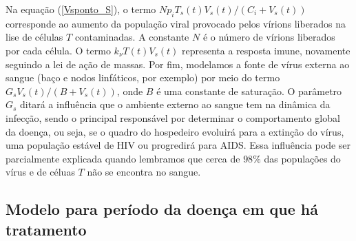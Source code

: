 Na equação (\ref{Vsponto_S}), o termo \( N p_{ i } T_{ s } ( t ) V_{ s } ( t ) / ( C_{ i } + V_{ s } ( t ) ) \) corresponde ao aumento da população viral provocado pelos vírions liberados na lise de células \( T \) contaminadas.
A constante \( N \) é o número de vírions liberados por cada célula.
O termo \( k_{ \nu } T ( t ) V_{ s } ( t ) \) representa a resposta imune, novamente seguindo a lei de ação de massas.
Por fim, modelamos a fonte de vírus externa ao sangue (baço e nodos linfáticos, por exemplo) por meio do termo \( G_{ s } V_{ s } ( t ) / ( B + V_{ s } ( t ) ) \), onde \( B \) é uma constante de saturação.
O parâmetro \( G_{ s } \) ditará a influência que o ambiente externo ao sangue tem na dinâmica da infecção, sendo o principal responsável por determinar o comportamento global da doença, ou seja, se o quadro do hospedeiro evoluirá para a extinção do vírus, uma população estável de HIV ou progredirá para AIDS.
Essa influência pode ser parcialmente explicada quando lembramos que cerca de \( 98 \% \) das populações do vírus e de céluas \( T \) não se encontra no sangue.

\subsection{Modelo para período da doença em que há tratamento}

